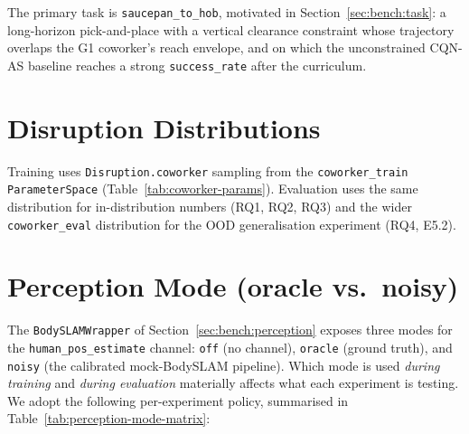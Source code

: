 \documentclass[11pt,a4paper]{report}
\newcommand{\cqnas}{CQN-AS}
\newcommand{\bodyslampp}{BodySLAM\nolinebreak[4]\hspace{-.05em}\raisebox{.2ex}{\scriptsize ++}}
\begin{document}
The primary task is \texttt{saucepan\_to\_hob}, motivated in
Section~\ref{sec:bench:task}: a long-horizon pick-and-place with a
vertical clearance constraint whose trajectory overlaps the G1
coworker's reach envelope, and on which the unconstrained \cqnas{}
baseline reaches a strong \texttt{success\_rate} after the curriculum.

\section{Disruption Distributions}
\label{sec:setup:disruptions}

Training uses \texttt{Disruption.coworker} sampling from the
\texttt{coworker\_train} \texttt{ParameterSpace}
(Table~\ref{tab:coworker-params}). Evaluation uses the same
distribution for in-distribution numbers (RQ1, RQ2, RQ3) and the
wider \texttt{coworker\_eval} distribution for the OOD
generalisation experiment (RQ4, E5.2).

\section{Perception Mode (oracle vs.\ noisy)}
\label{sec:setup:perception-mode}

The \texttt{BodySLAMWrapper} of Section~\ref{sec:bench:perception}
exposes three modes for the \texttt{human\_pos\_estimate} channel:
\texttt{off} (no channel), \texttt{oracle} (ground truth), and
\texttt{noisy} (the calibrated mock-\bodyslampp{} pipeline). Which
mode is used \emph{during training} and \emph{during evaluation}
materially affects what each experiment is testing. We adopt the
following per-experiment policy, summarised in
Table~\ref{tab:perception-mode-matrix}:
\end{document}

